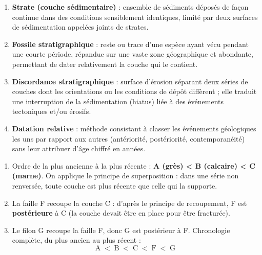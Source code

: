 \documentclass[11pt]{article}
\newcommand{\cle}[1]{{\popxbold\color{popdark}#1}}
\begin{document}
\begin{corrige}

\begin{enumerate}
\item \textbf{Strate (couche sédimentaire)} : ensemble de sédiments déposés de façon continue dans des conditions sensiblement identiques, limité par deux surfaces de sédimentation appelées \cle{joints de strates}.
\item \textbf{Fossile stratigraphique} : reste ou trace d'une espèce ayant vécu pendant une courte période, répandue sur une vaste zone géographique et abondante, permettant de dater relativement la couche qui le contient.
\item \textbf{Discordance stratigraphique} : surface d'érosion séparant deux séries de couches dont les orientations ou les conditions de dépôt diffèrent ; elle traduit une interruption de la sédimentation (hiatus) liée à des événements tectoniques et/ou érosifs.
\item \textbf{Datation relative} : méthode consistant à classer les événements géologiques les uns par rapport aux autres (antériorité, postériorité, contemporanéité) sans leur attribuer d'âge chiffré en années.
\end{enumerate}
\end{corrige}

\begin{corrige}

\begin{enumerate}
\item Ordre de la plus ancienne à la plus récente : \textbf{A (grès) < B (calcaire) < C (marne)}. On applique le \cle{principe de superposition} : dans une série non renversée, toute couche est plus récente que celle qui la supporte.
\item La faille F recoupe la couche C : d'après le \cle{principe de recoupement}, F est \textbf{postérieure} à C (la couche devait être en place pour être fracturée).
\item Le filon G recoupe la faille F, donc G est postérieur à F. Chronologie complète, du plus ancien au plus récent :
\[ \text{A} \;<\; \text{B} \;<\; \text{C} \;<\; \text{F} \;<\; \text{G} \]
\end{enumerate}
\end{corrige}
\end{document}
